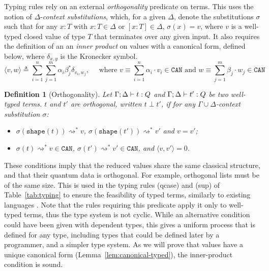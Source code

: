 \documentclass[10pt,a4paper]{article}
\newcommand{\shape}[1]{\mathtt{shape}(#1)}
\newcommand{\can}{\ensuremath{\mathtt{CAN}}}
\newcommand{\vartyping}[2]{#1 : #2}
\newcommand{\typing}[4]{
  \ifx&#1&\varnothing \else #1\fi; 
  \ifx&#2&\varnothing \else #2\fi 
  \vdash {#3} : #4
}
\newcommand{\shapemarker}[1]{[#1]}
\newcommand\kron[2]{\delta_{#1, #2}}
\newcommand{\reduces}{\rightsquigarrow}
\newcommand{\sreduces}{\reduces^*}
\newtheorem{definition}[theorem]{Definition}
\begin{document}
Typing rules rely on an external \emph{orthogonality} predicate on terms. This
uses the notion of $\Delta$-\emph{context substitutions}, which, for a given
$\Delta$, denote the substitutions $\sigma$ such that for any $x : T$ with
$\vartyping x T \in \Delta$ or $\shapemarker{\vartyping x T} \in \Delta$,
$ \sigma(x)=v$, where $v$ is a well-typed closed value of type $T$
that terminates over any given input. It also requires the definition of an
an \emph{inner product} on values with a canonical form, defined
below, where $\kron x y$ is the Kronecker symbol.
\[
  \langle v, w \rangle \triangleq \sum_{i=1}^n \sum_{j=1}^m \alpha_i \beta_j^*
  \kron{v_i}{w_j}, \quad \text{ where }
  v \equiv \sum_{i=1}^n \alpha_i \cdot v_i \in \can \text{ and }
  w \equiv \sum_{j=1}^m \beta_j \cdot w_j \in \can
\]
\begin{definition}[Orthogonality]
  \label{def:orthogonality}
  Let $\typing \Gamma \Delta t Q$ and $\typing \Gamma \Delta {t'} Q$ be
  two well-typed terms. $t$ and $t'$ are \emph{orthogonal}, written $t \perp
  t'$, if for any $\Gamma \cup \Delta$-context substitution $\sigma$:
  \begin{itemize}
    \item $ \sigma(\shape t) \sreduces v$, $\sigma(\shape{t'})
      \sreduces v'$ and $v = v'$;
    \item $\sigma(t) \sreduces v \in \can$,
      $\sigma(t') \sreduces v' \in \can$,
      and $\langle v, v' \rangle = 0$.
  \end{itemize}
\end{definition}

These conditions imply that the reduced values share the same classical
structure, and that their quantum data is orthogonal. For example, orthogonal
lists must be of the same size. This is used in the typing rules
(qcase) and (sup) of Table~\ref{tab:typing} to ensure the feasibility of typed terms, similarly to
existing languages \cite{DCM22,Lem24,DLPZ25}. Note that the rules requiring
this predicate apply it only to well-typed terms, thus the type system is not
cyclic. While an alternative condition could have been given with dependent
types, this gives a uniform process that is defined for any type, including
types that could be defined later by a programmer, and a simpler type system.
As we will prove that values have a unique canonical form
(Lemma~\ref{lem:canonical-typed}), the inner-product condition is sound.
\end{document}
